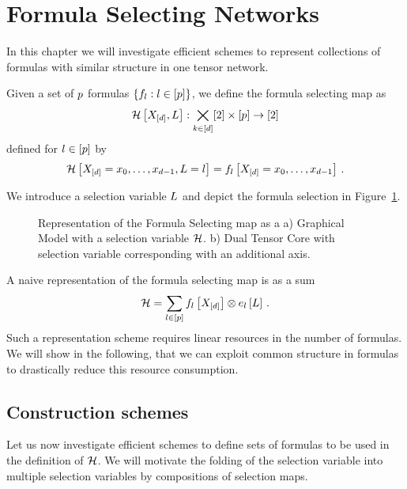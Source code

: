 \section{Formula Selecting Networks} \label{cha:formulaSelection}

In this chapter we will investigate efficient schemes to represent collections of formulas with similar structure in one tensor network.

\begin{definition}
	Given a set of $p$ formulas $\{f_{l} : l\in[p]\}$, we define the formula selecting map as
		\[  \mathcal{H}\left[X_{[d]},L\right] : \bigtimes_{k\in[d]}[2] \times [p] \rightarrow [2] \]
	defined for $l\in[p]$ by
		\[ \mathcal{H}\left[X_{[d]}={x_{0},\ldots,x_{d-1}},L=l\right] =  f_{l}\left[X_{[d]}={x_{0},\ldots,x_{d-1}}\right] \, . \]
\end{definition}

We introduce a selection variable $L$ and depict the formula selection in Figure~\ref{fig:formulaSelectionMap}.

\begin{figure}[h]
\begin{center}
	
\end{center}
\caption{Representation of the Formula Selecting map as a 
a) Graphical Model with a selection variable $\mathcal{H}$.
b) Dual Tensor Core with selection variable corresponding with an additional axis.}
\label{fig:formulaSelectionMap}
\end{figure}


A naive representation of the formula selecting map is as a sum
	\[ \mathcal{H} = \sum_{l\in[p]} f_{l}\left[X_{[d]}\right]  \otimes e_{l}\left[L\right] \, . \]
Such a representation scheme requires linear resources in the number of formulas.
We will show in the following, that we can exploit common structure in formulas to drastically reduce this resource consumption.



\subsection{Construction schemes}

Let us now investigate efficient schemes to define sets of formulas to be used in the definition of $\mathcal{H}$.
We will motivate the folding of the selection variable into multiple selection variables by compositions of selection maps.


